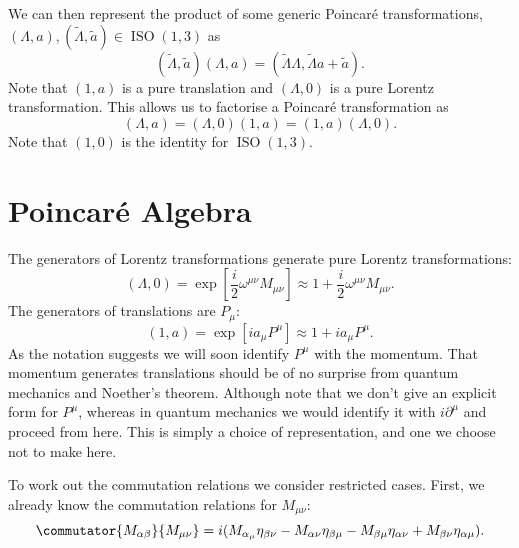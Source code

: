 \documentclass[fleqn]{NotesClass}
\newcommand{\ident}{1}
\newcommand{\minkowskiMetric}{\eta}
\DeclareMathOperator{\ISO}{ISO}
\begin{document}
    We can then represent the product of some generic Poincar\'e transformations, \((\Lambda, a), (\tilde{\Lambda}, \tilde{a}) \in \ISO(1, 3)\) as
    \begin{equation}
        (\tilde{\Lambda}, \tilde{a})(\Lambda, a) = (\tilde{\Lambda}\Lambda, \tilde{\Lambda} a + \tilde{a}).
    \end{equation}
    Note that \((\ident, a)\) is a pure translation and \((\Lambda, 0)\) is a pure Lorentz transformation.
    This allows us to factorise a Poincar\'e transformation as
    \begin{equation}
        (\Lambda, a) = (\Lambda, 0)(\ident, a) = (\ident, a)(\Lambda, 0).
    \end{equation}
    Note that \((\ident, 0)\) is the identity for \(\ISO(1, 3)\).
    
    \section{Poincar\'e Algebra}
    The generators of Lorentz transformations generate pure Lorentz transformations:
    \begin{equation}
        (\Lambda, 0) = \exp\left[ \frac{i}{2}\omega^{\mu\nu}M_{\mu\nu} \right] \approx 1 + \frac{i}{2}\omega^{\mu\nu}M_{\mu\nu}.
    \end{equation}
    The generators of translations are \(P_\mu\):
    \begin{equation}
        (\ident, a) = \exp[ia_\mu P^\mu] \approx 1 + ia_\mu P^\mu.
    \end{equation}
    As the notation suggests we will soon identify \(P^\mu\) with the momentum.
    That momentum generates translations should be of no surprise from quantum mechanics and Noether's theorem.
    Although note that we don't give an explicit form for \(P^\mu\), whereas in quantum mechanics we would identify it with \(i\partial^\mu\) and proceed from here.
    This is simply a choice of representation, and one we choose not to make here.
    
    To work out the commutation relations we consider restricted cases.
    First, we already know the commutation relations for \(M_{\mu\nu}\):
    \begin{equation}
        \commutator{M_{\alpha\beta}}{M_{\mu\nu}} = i(M_{\alpha_\mu} \minkowskiMetric_{\beta\nu} - M_{\alpha\nu} \minkowskiMetric_{\beta\mu} - M_{\beta\mu} \minkowskiMetric_{\alpha\nu} + M_{\beta\nu} \minkowskiMetric_{\alpha\mu}).
    \end{equation}
\end{document}
